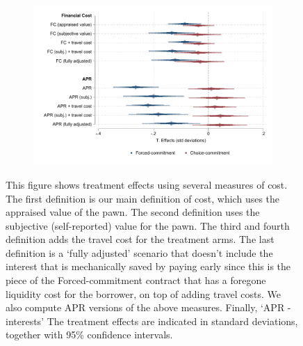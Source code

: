 \documentclass[oneside,11pt]{article}
\begin{document}
\begin{figure}[H]
     \caption{Several definitions of cost}
    \label{robustness_fc}
    \begin{center}
    \begin{subfigure}{0.75\textwidth}
        \centering
        \includegraphics[width=\textwidth]{Figuras/fc_robustness.pdf}
    \end{subfigure}
    \end{center}
    \scriptsize
    This figure shows treatment effects using several measures of cost. The first definition is our main definition of cost, which uses the appraised value of the pawn. The second definition uses the subjective (self-reported) value for the pawn. The third and fourth definition adds the travel cost for the treatment arms. The last definition is a `fully adjusted' scenario that doesn't include the interest that is mechanically saved by paying early since this is the piece of the Forced-commitment contract that has a foregone liquidity cost for the borrower, on top of adding travel costs. We also compute APR versions of the above measures. 
    Finally, `APR - interests'  The treatment effects are indicated in standard deviations, together with 95\% confidence intervals.
\end{figure}

\cleardoublepage
\end{document}
